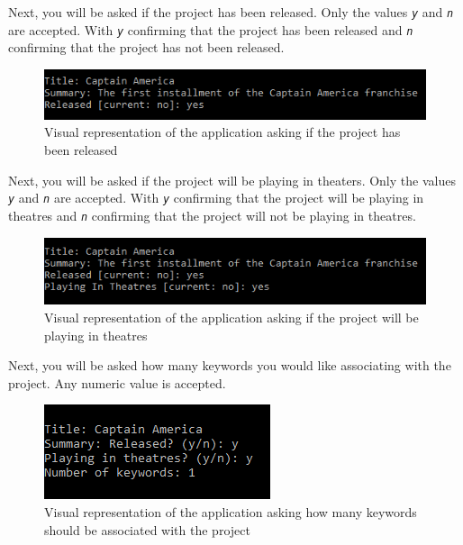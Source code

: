 \documentclass[
  english,
  a4paper,
,tablecaptionabove
]{scrartcl}
\begin{document}
Next, you will be asked if the project has been released. Only the
values \emph{\texttt{y}} and \emph{\texttt{n}} are accepted. With
\emph{\texttt{y}} confirming that the project has been released and
\emph{\texttt{n}} confirming that the project has not been released.

\begin{figure}
\centering
\includegraphics{images/user-guide/maintenance-mode/add-project-released.png}
\caption{Visual representation of the application asking if the project
has been released}
\end{figure}

Next, you will be asked if the project will be playing in theaters. Only
the values \emph{\texttt{y}} and \emph{\texttt{n}} are accepted. With
\emph{\texttt{y}} confirming that the project will be playing in
theatres and \emph{\texttt{n}} confirming that the project will not be
playing in theatres.

\begin{figure}
\centering
\includegraphics{images/user-guide/maintenance-mode/add-project-theatres.png}
\caption{Visual representation of the application asking if the project
will be playing in theatres}
\end{figure}

Next, you will be asked how many keywords you would like associating
with the project. Any numeric value is accepted.

\begin{figure}
\centering
\includegraphics{images/user-guide/maintenance-mode/add-project-keywords-amount.png}
\caption{Visual representation of the application asking how many
keywords should be associated with the project}
\end{figure}
\end{document}
